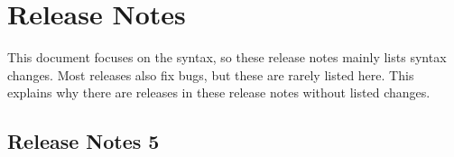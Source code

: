 
\section{Release Notes}
%
This document focuses on the \INTENS{} syntax, so these release notes mainly lists
syntax changes.
Most \INTENS{} releases also fix bugs, but these are rarely listed here.
This explains why there are releases in these release notes without listed changes.

\subsection{Release Notes 5}




